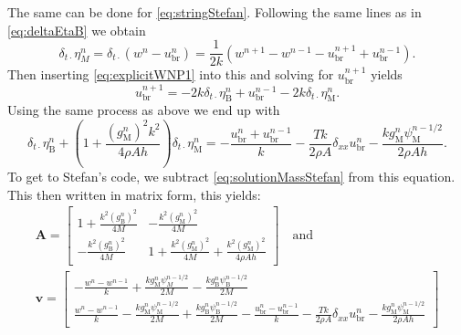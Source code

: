 \documentclass{article}
\begin{document}
The same can be done for \eqref{eq:stringStefan}. Following the same lines as in \eqref{eq:deltaEtaB} we obtain
\begin{equation}
    \delta_{t\cdot}\eta_M^n = \delta_{t\cdot}(w^n-u_\text{br}^n)=\frac{1}{2k}\left(w^{n+1}-w^{n-1}-u_\text{br}^{n+1}+u_\text{br}^{n-1}\right).
\end{equation}
Then inserting \eqref{eq:explicitWNP1} into this and solving for $u_\text{br}^{n+1}$ yields
\begin{equation}
    u_\text{br}^{n+1} = -2k\delta_{t\cdot}\eta_\text{B}^n+u_\text{br}^{n-1}-2k\delta_{t\cdot}\eta_\text{M}^n .
\end{equation}
Using the same process as above we end up with
\begin{equation}
    \delta_{t\cdot}\eta^n_\text{B}+\left(1+\frac{(g_\text{M}^n)^2k^2}{4\rho Ah}\right)\delta_{t\cdot}\eta^n_\text{M} = -\frac{u_\text{br}^n+u_\text{br}^{n-1}}{k}-\frac{Tk}{2\rho A}\delta_{xx}u^n_\text{br}-\frac{kg_\text{M}^n\psi_\text{M}^{n-1/2}}{2\rho Ah}.
\end{equation}
To get to Stefan's code, we subtract \eqref{eq:solutionMassStefan} from this equation. This then written in matrix form, this yields:
\begin{equation}
\begin{gathered}
\mathbf{A} = 
    \begin{bmatrix}
        1+\frac{k^2(g_\text{B}^n)^2}{4M} & -\frac{k^2(g_\text{M}^n)^2}{4M}\\
        -\frac{k^2(g_\text{B}^n)^2}{4M} & 1+\frac{k^2(g_\text{M}^n)^2}{4M}+\frac{k^2(g_\text{M}^n)^2}{4\rho Ah}
    \end{bmatrix}
    \quad \text{and}\\
    \mathbf{v} = 
    \begin{bmatrix}
        -\frac{w^n-w^{n-1}}{k}+\frac{kg_\text{M}^n\psi^{n-1/2}_M}{2M}-\frac{kg_\text{B}^n\psi_\text{B}^{n-1/2}}{2M}\\
        \frac{w^n-w^{n-1}}{k}-\frac{kg_\text{M}^n\psi_\text{M}^{n-1/2}}{2M}+\frac{kg_\text{B}^n\psi_\text{B}^{n-1/2}}{2M}-\frac{u_\text{br}^n-u_\text{br}^{n-1}}{k}-\frac{Tk}{2\rho A}\delta_{xx}u_\text{br}^n-\frac{kg_\text{M}^n\psi_\text{M}^{n-1/2}}{2\rho Ah}
    \end{bmatrix}
    \nonumber
\end{gathered}
\end{equation}
\end{document}

